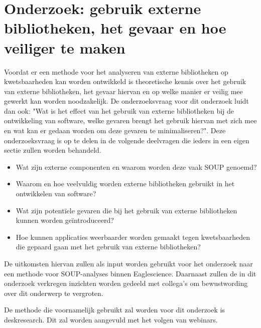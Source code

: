 \chapter{Onderzoek: gebruik externe bibliotheken, het gevaar en hoe veiliger te maken}\label{ch:externeBibliothekengebruikGevaren}
Voordat er een methode voor het analyseren van externe bibliotheken op kwetsbaarheden kan worden ontwikkeld is theoretische kennis over het gebruik van externe bibliotheken, het gevaar hiervan en op welke manier er veilig mee gewerkt kan worden noodzakelijk. De onderzoeksvraag voor dit onderzoek luidt dan ook: "Wat is het effect van het gebruik van externe bibliotheken bij de ontwikkeling van software, welke gevaren brengt het gebruik hiervan met zich mee en wat kan er gedaan worden om deze gevaren te minimaliseren?". Deze onderzoeksvraag is op te delen in de volgende deelvragen die ieders in een eigen sectie zullen worden behandeld.

\begin{itemize}
    \item Wat zijn externe componenten en waarom worden deze vaak SOUP genoemd?
    \item Waarom en hoe veelvuldig worden externe bibliotheken gebruikt in het ontwikkelen van software?
    \item Wat zijn potentïele gevaren die bij het gebruik van externe bibliotheken kunnen worden geïntroduceerd?
    \item Hoe kunnen applicaties weerbaarder worden gemaakt tegen kwetsbaarheden die gepaard gaan met het gebruik van externe bibliotheken?
\end{itemize}
De uitkomsten hiervan zullen als input worden gebruikt voor het onderzoek naar een methode voor SOUP-analyses binnen Eaglescience. Daarnaast zullen de in dit onderzoek verkregen inzichten worden gedeeld met collega's om bewustwording over dit onderwerp te vergroten.

De methode die voornamelijk gebruikt zal worden voor dit onderzoek is deskresearch. Dit zal worden aangevuld met het volgen van webinars.

